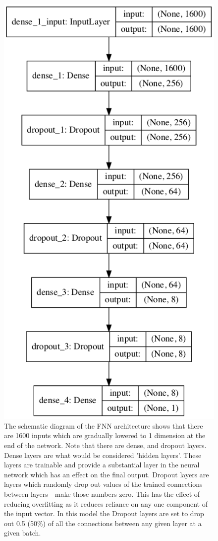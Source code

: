 \documentclass[a4paper,fleqn,usenatbib]{mnras}
\begin{document}
\begin{figure}
\includegraphics[width=\columnwidth]{../Figures/FNN_model_self}
\caption{The schematic diagram of the FNN architecture shows that there are 1600 inputs which are gradually lowered to 1 dimension at the end of the network. Note that there are dense, and dropout layers. Dense layers are what would be considered 'hidden layers'. These layers are trainable and provide a substantial layer in the neural network which has an effect on the final output. Dropout layers are layers which randomly drop out values of the trained connections between layers---make those numbers zero. This has the effect of reducing overfitting as it reduces reliance on any one component of the input vector. In this model the Dropout layers are set to drop out 0.5 (50\%) of all the connections between any given layer at a given batch. \label{fig:FNNModel}}
\end{figure}
\end{document}
